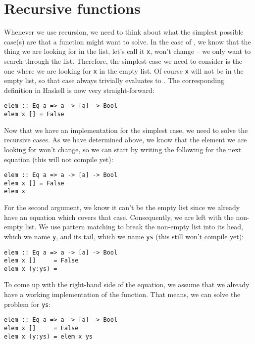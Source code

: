 \section{Recursive functions}

	
Whenever we use recursion, we need to think about what the simplest possible case(s) are that a function might want to solve. In the case of , we know that the thing we are looking for in the list, let's call it \texttt{\small x}, won't change -- we only want to search through the list. Therefore, the simplest case we need to consider is the one where we are looking for \texttt{\small x} in the empty list. Of course \texttt{\small x} will not be in the empty list, so that case always trivially evaluates to . The corresponding definition in Haskell is now very straight-forward: 
\begin{verbatim}
elem :: Eq a => a -> [a] -> Bool
elem x [] = False
\end{verbatim}
Now that we have an implementation for the simplest case, we need to solve the recursive cases. As we have determined above, we know that the element we are looking for won't change, so we can start by writing the following for the next equation (this will not compile yet): 
\begin{verbatim}
elem :: Eq a => a -> [a] -> Bool
elem x [] = False
elem x
\end{verbatim}
For the second argument, we know it can't be the empty list since we already have an equation which covers that case. Consequently, we are left with the non-empty list. We use pattern matching to break the non-empty list into its head, which we name \texttt{\small y}, and its tail, which we name \texttt{\small ys} (this still won't compile yet):
\begin{verbatim}
elem :: Eq a => a -> [a] -> Bool
elem x []     = False
elem x (y:ys) =
\end{verbatim}
To come up with the right-hand side of the equation, we assume that we already have a working implementation of the  function. That means, we can solve the problem for \texttt{\small ys}:
\begin{verbatim}
elem :: Eq a => a -> [a] -> Bool
elem x []     = False
elem x (y:ys) = elem x ys
\end{verbatim}
